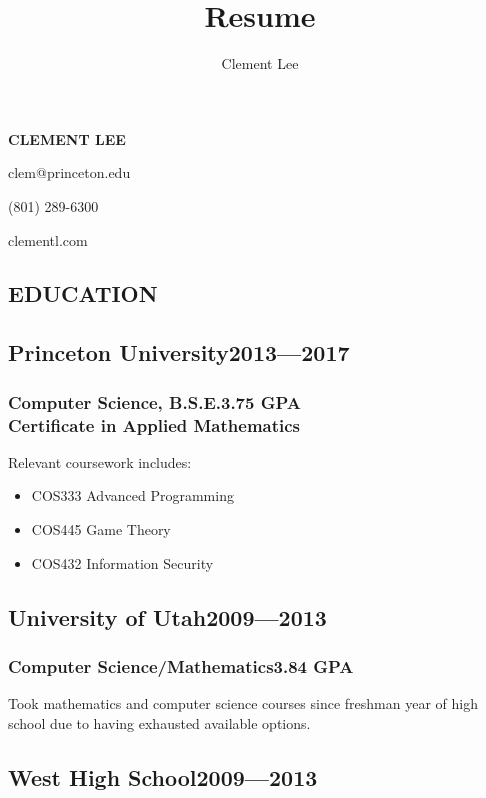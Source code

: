 \documentclass[11pt]{article}
\author{Clement Lee}
\title{Resume}
\begin{document}
\vspace*{1.5em}

{\huge\textbf{CLEMENT LEE}}
\vspace{0.25\baselineskip}

clem@princeton.edu

(801) 289-6300

clementl.com

\vspace{\baselineskip}
\begin{multicols}{2}
  \section*{EDUCATION}
  \subsection*{Princeton University\hfill\textnormal{2013---2017}}
  \subsubsection*{Computer Science, B.S.E.\hfill\textnormal{3.75 GPA}\\
    Certificate in Applied Mathematics}

  Relevant coursework includes:
  \begin{itemize}[noitemsep,nolistsep,leftmargin=*]
    \item COS333 Advanced Programming
    \item COS445 Game Theory
    \item COS432 Information Security
  \end{itemize}

  \subsection*{University of Utah\hfill\textnormal{2009---2013}}
  \subsubsection*{Computer Science/Mathematics\hfill\textnormal{3.84 GPA}}
  Took mathematics and computer science courses since freshman year of high school due to having exhausted available options.

  \subsection*{West High School\hfill\textnormal{2009---2013}}

\end{multicols}
\end{document}
